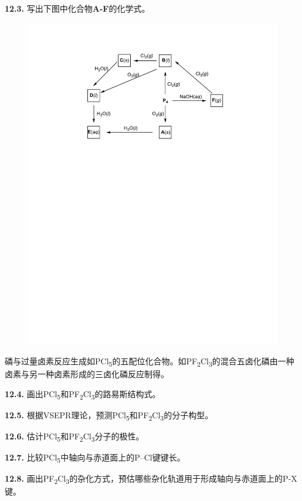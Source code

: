 \noindent\textbf{12.3.} 写出下图中化合物\textbf{A-F}的化学式。

\begin{figure}[h]
	\centering
	\includegraphics[width=12cm]{./pic/t12-3.pdf}
\end{figure}

磷与过量卤素反应生成如PCl\textsubscript{5}的五配位化合物。如PF\textsubscript{2}Cl\textsubscript{3}的混合五卤化磷由一种卤素与另一种卤素形成的三卤化磷反应制得。

\noindent\textbf{12.4.}
画出PCl\textsubscript{5}和PF\textsubscript{2}Cl\textsubscript{3}的路易斯结构式。

\noindent\textbf{12.5.}
根据VSEPR理论，预测PCl\textsubscript{5}和PF\textsubscript{2}Cl\textsubscript{3}的分子构型。

\noindent\textbf{12.6.}
估计PCl\textsubscript{5}和PF\textsubscript{2}Cl\textsubscript{3}分子的极性。

\noindent\textbf{12.7.} 比较PCl\textsubscript{5}中轴向与赤道面上的P--Cl键键长。

\noindent\textbf{12.8.}
画出PF\textsubscript{2}Cl\textsubscript{3}的杂化方式，预估哪些杂化轨道用于形成轴向与赤道面上的P-X键。


